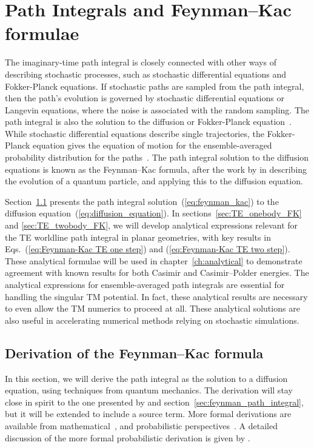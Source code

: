 \chapter{Path Integrals and Feynman--Kac formulae}

\label{ch:feynman_kac}

The imaginary-time path integral is closely connected with other ways of describing stochastic processes, 
such as stochastic differential equations and Fokker-Planck equations.
If stochastic paths are sampled from the path integral, then the path's evolution is governed by stochastic
differential equations or Langevin equations, where the noise is associated with the random sampling.
The path integral is also the solution to the diffusion or Fokker-Planck equation~\citep{Karatzas1991, Durrett1996}.
While stochastic differential equations describe single trajectories, the Fokker-Planck equation gives
the equation of motion for the ensemble-averaged probability distribution for the paths~\citep{Gardiner2009}.
The path integral solution to the diffusion equations is known as the Feynman--Kac formula,
after the work by \citet{Feynman1948} in describing the evolution of a quantum particle, and \citet{Kac1949}
 applying this to the diffusion equation.

Section~\ref{sec:derive_feynman_kac} presents the path integral solution~(\ref{eq:feynman_kac}) to the diffusion equation~(\ref{eq:diffusion_equation}).
In sections~\ref{sec:TE_onebody_FK} and \ref{sec:TE_twobody_FK}, we will develop analytical expressions relevant for the TE
worldline path integral in planar geometries, with key results in Eqs.~(\ref{eq:Feynman-Kac TE one step}) and
(\ref{eq:Feynman-Kac TE two step}).
These analytical formulae will be used in chapter~\ref{ch:analytical} to demonstrate agreement 
with known results for both Casimir and Casimir--Polder energies.
The analytical expressions for ensemble-averaged path integrals are essential for handling the singular 
TM potential.  
In fact, these analytical results are necessary to even allow the TM numerics to proceed at all.
These analytical solutions are also useful in accelerating numerical methods relying 
on stochastic simulations.  

\section{Derivation of the Feynman--Kac formula }
\label{sec:derive_feynman_kac}
In this section, we will derive the path integral as the solution to a diffusion equation,
using techniques from quantum mechanics.
The derivation will stay close in spirit to the one presented by \citet{Sakurai1994} and section~\ref{sec:feynman_path_integral}, 
but it will be extended to include a source term.  
More formal derivations are available from mathematical~\citep{Cartier2004},
and probabilistic perspectives~\citep{Karatzas1991, Durrett1996}.  
A detailed discussion of the more formal probabilistic derivation is given by \citet[\S 17.9]{SteckNotes}.

